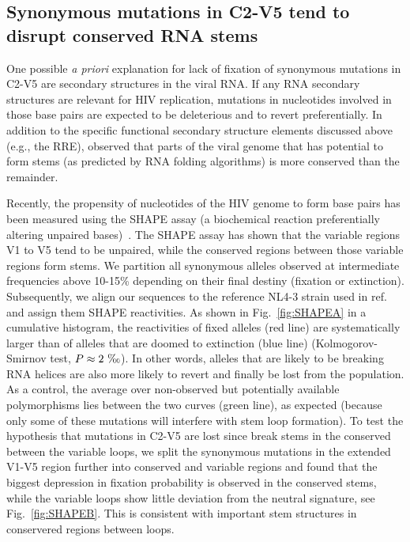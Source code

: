 \documentclass[rmp, twocolumn]{revtex4}
\newcommand{\FIG}[1]{Fig.~\ref{fig:#1}}
\begin{document}
\subsection{Synonymous mutations in C2-V5 tend to disrupt conserved RNA stems}

One possible {\it a priori} explanation for lack of fixation of synonymous
mutations in C2-V5 are  secondary structures in the viral RNA. If any RNA
secondary structures are relevant for HIV replication, mutations in nucleotides
involved in those base pairs are expected to be deleterious and to revert
preferentially. In addition to the specific functional secondary structure
elements discussed above (e.g., the RRE), \citet{forsdyke_reciprocal_1995}
observed that parts of the viral genome that has potential to
form stems (as predicted by RNA folding algorithms) is more conserved than the
remainder.

Recently, the propensity of nucleotides of the HIV genome to form base pairs has
been measured using the SHAPE assay (a biochemical reaction preferentially
altering unpaired bases)~\citep{watts_architecture_2009}. The SHAPE assay has
shown that the variable regions V1 to V5 tend to be unpaired, while the
conserved regions between those variable regions form stems. We partition all
synonymous alleles observed at intermediate frequencies above 10-15\% depending
on their final destiny (fixation or extinction). Subsequently, we align our
sequences to the reference NL4-3 strain used in
ref.~\citep{watts_architecture_2009} and assign them SHAPE reactivities. As
shown in \FIG{SHAPEA} in a cumulative histogram, the reactivities of fixed
alleles (red line) are systematically larger than of alleles that are doomed to
extinction (blue line) (Kolmogorov-Smirnov test, $P\approx
2~\text{\textperthousand}$). In other words, alleles that are likely to be
breaking RNA helices are also more likely to revert and finally be lost from the
population. As a control, the average over non-observed but potentially
available polymorphisms lies between the two curves (green line), as expected
(because only some of these mutations will interfere with stem loop formation).
To test the hypothesis that mutations in C2-V5 are lost since break stems
in the conserved between the variable loops, we split the synonymous mutations
in the extended V1-V5 region further into conserved and variable regions and
found that the biggest depression in fixation probability is observed in the
conserved stems, while the variable loops show little deviation from the
neutral signature, see \FIG{SHAPEB}. This is consistent with important stem
structures in conservered regions between loops.
\end{document}
